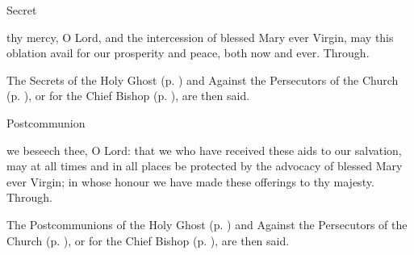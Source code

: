 \begin{inhead}
    Secret
\end{inhead}
 thy mercy, O Lord, and the intercession of blessed Mary ever Virgin, may this oblation avail for our prosperity and peace, both now and ever. Through.
\begin{rubric}
    The Secrets of the Holy Ghost (p. \pageref{SPHolyGhost}) and Against the Persecutors of the Church (p. \pageref{SPAgainst}), or for the Chief Bishop (p. \pageref{SPChiefBishop}), are then said.
\end{rubric}
\begin{inhead}
    Postcommunion
\end{inhead}
 we beseech thee, O Lord: that we who have received these aids to our salvation, may at all times and in all places be protected by the advocacy of blessed Mary ever Virgin; in whose honour we have made these offerings to thy majesty. Through.
\begin{rubric}
    The Postcommunions of the Holy Ghost (p. \pageref{SPHolyGhost}) and Against the Persecutors of the Church (p. \pageref{SPAgainst}), or for the Chief Bishop (p. \pageref{SPChiefBishop}), are then said.
\end{rubric}

